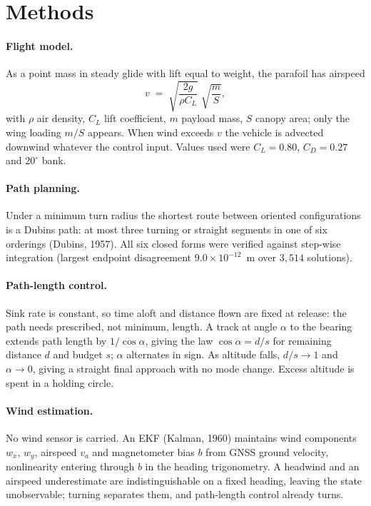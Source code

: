 \documentclass[11pt,a4paper]{article}
\begin{document}
\section{Methods}

\paragraph{Flight model.} As a point mass in steady glide with lift equal to
weight, the parafoil has airspeed
\begin{equation}\label{eq:v}
v \;=\; \sqrt{\frac{2g}{\rho C_L}}\;\sqrt{\frac{m}{S}},
\end{equation}
with $\rho$ air density, $C_L$ lift coefficient, $m$ payload mass, $S$ canopy
area; only the wing loading $m/S$ appears. When wind exceeds $v$ the vehicle is
advected downwind whatever the control input. Values used were $C_L = 0.80$,
$C_D = 0.27$ and $20^{\circ}$ bank.

\paragraph{Path planning.} Under a minimum turn radius the shortest route between
oriented configurations is a Dubins path: at most three turning or straight
segments in one of six orderings (Dubins, 1957). All six closed forms were
verified against step-wise integration (largest endpoint disagreement
$9.0\times10^{-12}$~m over $3{,}514$ solutions).


\paragraph{Path-length control.} Sink rate is constant, so time aloft and
distance flown are fixed at release: the path needs prescribed, not minimum,
length. A track at angle $\alpha$ to the bearing extends path length by
$1/\cos\alpha$, giving the law $\cos\alpha = d/s$ for remaining distance $d$ and
budget $s$; $\alpha$ alternates in sign. As altitude falls,
$d/s \to 1$ and $\alpha \to 0$, giving a straight final approach with no mode
change. Excess altitude is spent in a holding circle.


\paragraph{Wind estimation.} No wind sensor is carried. An EKF (Kalman, 1960)
maintains wind components $w_x$, $w_y$, airspeed $v_a$ and magnetometer bias $b$
from GNSS ground velocity, nonlinearity entering through $b$ in the heading
trigonometry. A headwind and an airspeed underestimate are indistinguishable on a
fixed heading, leaving the state unobservable; turning separates them, and
path-length control already turns.
\end{document}
